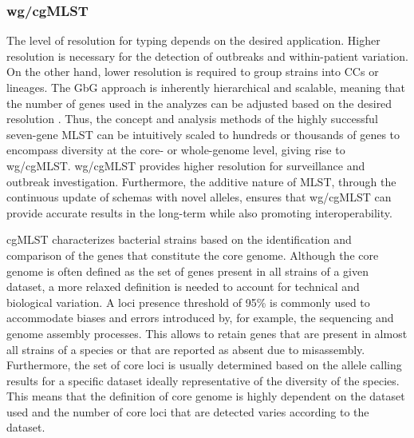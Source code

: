 \subsubsection{wg/cgMLST}

The level of resolution for typing depends on the desired application. Higher resolution is necessary for the detection of outbreaks and within-patient variation. On the other hand, lower resolution is required to group strains into \ac{CC}s or lineages. The \ac{GbG} approach is inherently hierarchical and scalable, meaning that the number of genes used in the analyzes can be adjusted based on the desired resolution \cite{maiden_mlst_2013}. Thus, the concept and analysis methods of the highly successful seven-gene \ac{MLST} can be intuitively scaled to hundreds or thousands of genes to encompass diversity at the core- or whole-genome level, giving rise to \ac{wg/cgMLST}. \ac{wg/cgMLST} provides higher resolution for surveillance and outbreak investigation. Furthermore, the additive nature of \ac{MLST}, through the continuous update of schemas with novel alleles, ensures that \ac{wg/cgMLST} can provide accurate results in the long-term while also promoting interoperability.

\ac{cgMLST} characterizes bacterial strains based on the identification and comparison of the genes that constitute the core genome. Although the core genome is often defined as the set of genes present in all strains of a given dataset, a more relaxed definition is needed to account for technical and biological variation. A loci presence threshold of 95\% is commonly used to accommodate biases and errors introduced by, for example, the sequencing and genome assembly processes. This allows to retain genes that are present in almost all strains of a species or that are reported as absent due to misassembly. Furthermore, the set of core loci is usually determined based on the allele calling results for a specific dataset ideally representative of the diversity of the species. This means that the definition of core genome is highly dependent on the dataset used and the number of core loci that are detected varies according to the dataset.

